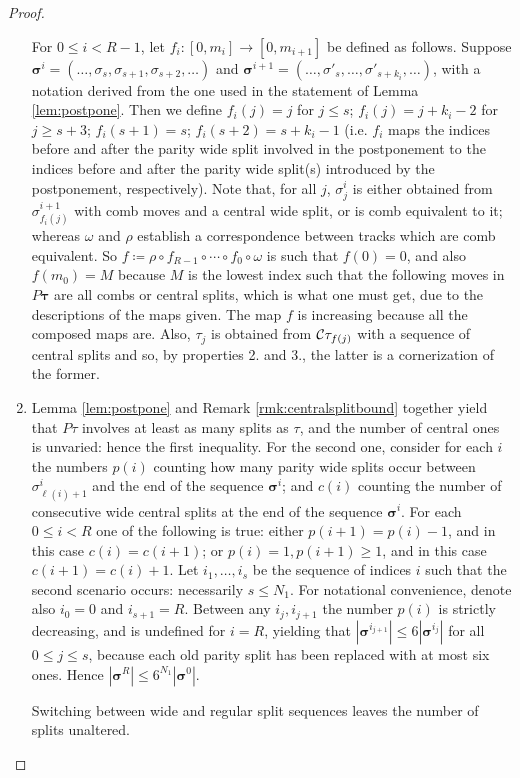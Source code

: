\begin{proof}
\begin{enumerate}
For $0\leq i<R-1$, let $f_i:[0,m_i]\rightarrow [0,m_{i+1}]$ be defined as follows. Suppose $\bm\sigma^i=(\ldots,\sigma_s,\sigma_{s+1},\sigma_{s+2},\ldots)$ and $\bm\sigma^{i+1}=(\ldots,\sigma'_s,\ldots,\sigma'_{s+k_i},\ldots)$, with a notation derived from the one used in the statement of Lemma \ref{lem:postpone}. Then we define $f_i(j)=j$ for $j\leq s$; $f_i(j)=j+k_i-2$ for $j\geq s+3$; $f_i(s+1)=s$; $f_i(s+2)=s+k_i-1$ (i.e. $f_i$ maps the indices before and after the parity wide split involved in the postponement to the indices before and after the parity wide split(s) introduced by the postponement, respectively). Note that, for all $j$, $\sigma^i_j$ is either obtained from $\sigma^{i+1}_{f_i(j)}$ with comb moves and a central wide split, or is  comb equivalent to it; whereas $\omega$ and $\rho$ establish a correspondence between tracks which are comb equivalent. So $f\coloneqq\rho\circ f_{R-1}\circ\cdots\circ f_0\circ\omega$ is such that $f(0)=0$, and also $f(m_0)=M$ because $M$ is the lowest index such that the following moves in $P\bm\tau$ are all combs or central splits, which is what one must get, due to the descriptions of the maps given. The map $f$ is increasing because all the composed maps are. Also, $\tau_j$ is obtained from ${\mathcal C}\tau_{f(j)}$ with a sequence of central splits and so, by properties 2. and 3., the latter is a cornerization of the former.

\item Lemma \ref{lem:postpone} and Remark \ref{rmk:centralsplitbound} together yield that $P\tau$ involves at least as many splits as $\tau$, and the number of central ones is unvaried: hence the first inequality. For the second one, consider for each $i$ the numbers $p(i)$ counting how many parity wide splits occur between $\sigma^i_{\ell(i)+1}$ and the end of the sequence $\bm\sigma^i$; and $c(i)$ counting the number of consecutive wide central splits at the end of the sequence $\bm\sigma^i$. For each $0\leq i <R$ one of the following is true: either $p(i+1)=p(i)-1$, and in this case $c(i)=c(i+1)$; or $p(i)=1,p(i+1)\geq 1$, and in this case $c(i+1)=c(i)+1$. Let $i_1,\ldots,i_s$ be the sequence of indices $i$ such that the second scenario occurs: necessarily $s\leq N_1$. For notational convenience, denote also $i_0=0$ and $i_{s+1}=R$. Between any $i_j,i_{j+1}$ the number $p(i)$ is strictly decreasing, and is undefined for $i=R$, yielding that $|\bm\sigma^{i_{j+1}}|\leq 6|\bm\sigma^{i_j}|$ for all $0\leq j\leq s$, because each old parity split has been replaced with at most six ones. Hence $|\bm\sigma^R|\leq 6^{N_1}|\bm\sigma^0|$.

Switching between wide and regular split sequences leaves the number of splits unaltered.
\end{enumerate}
\end{proof}

